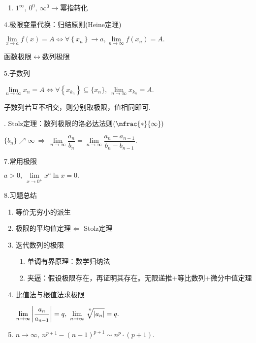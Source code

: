\documentclass[UTF8]{ctexart}
\newcommand\no{\noindent}
\newcommand\dis{\displaystyle}
\newcommand\limit{\dis\lim\limits}
\newcommand\limn{\dis\lim\limits_{n\to\infty}}
\begin{document}
\begin{spacing}{2}
\begin{enumerate}[itemindent=1.4em, label=(\arabic*)]
\item $1^\infty,\ 0^0,\ \infty^0\longrightarrow$幂指转化

\end{enumerate}

\no4.极限变量代换：归结原则(Heine定理)

$\limit_{x\to a}f(x)=A\Leftrightarrow\forall\left\{x_n\right\}\to a,\limn f(x_n)=A.$

函数极限$\leftrightarrow$数列极限

\no5.子数列

$\limn x_n=A\Leftrightarrow \forall \left\{x_{k_n}\right\}\subseteq\{x_n\},\ \limn x_{k_n}=A.$

子数列若互不相交，则分别取极限，值相同即可.

\no6. Stolz定理：数列极限的洛必达法则$\left(\mfrac{*}{\infty}\right)$

$\{b_n\}\nearrow\infty\ \Longrightarrow\ \limn\dfrac{a_n}{b_n}=\limn\dfrac{a_n-a_{n-1}}{b_n-b_{n-1}}.$

\no7.常用极限

$a>0,\  \limit_{x\to0^+}x^a\ln x=0.$

\no8.习题总结

\begin{enumerate}[itemindent=1.4em, label=(\arabic*)]

\item 等价无穷小的派生

\item 极限的平均值定理$\Longleftarrow$ Stolz定理

\item 迭代数列的极限

\begin{enumerate}[itemindent=1.4em, label=(\alph*)]

\item 单调有界原理：数学归纳法

\item 夹逼：假设极限存在，再证明其存在。无限递推$+$等比数列$+$微分中值定理

\end{enumerate}

\item 比值法与根值法求极限

\setlength\parindent{2em}$\limn \left|\dfrac{a_n}{a_{n-1}}\right|=q,\ 
\limn\sqrt[\leftroot{-3}\uproot{+7}n]{|a_n|}=q.$

\item $n\to\infty,\ n^{p+1}-(n-1)^{p+1}\sim n^p\cdot (p+1).$


\end{enumerate}
\end{spacing}
\end{document}

